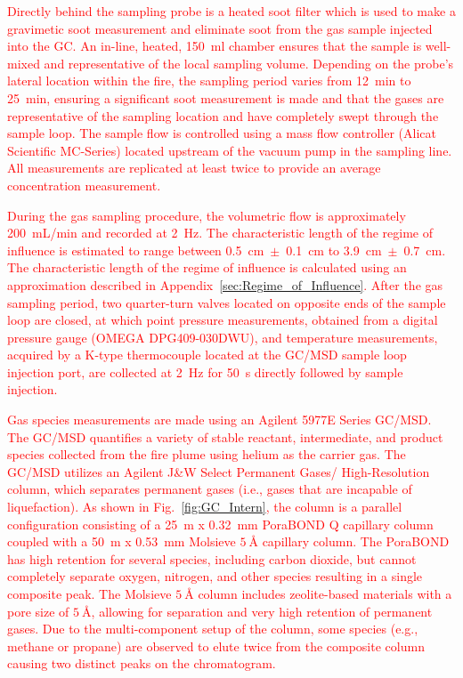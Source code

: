 \documentclass[12pt]{article}
\begin{document}
\textcolor{red}{Directly behind the sampling probe is a heated soot filter which is used to make a gravimetic soot measurement and eliminate soot from the gas sample injected into the GC. An in-line, heated, 150~ml chamber ensures that the sample is well-mixed and representative of the local sampling volume. Depending on the probe's lateral location within the fire, the sampling period varies from \SI{12}{min} to \SI{25}{min}, ensuring a significant soot measurement is made and that the gases are representative of the sampling location and have completely swept through the sample loop. The sample flow is controlled using a mass flow controller (Alicat Scientific MC-Series) located upstream of the vacuum pump in the sampling line. All measurements are replicated at least twice to provide an average concentration measurement.}

\textcolor{red}{During the gas sampling procedure, the volumetric flow is approximately 200~mL/min and recorded at \SI{2}{\hertz}. The characteristic length of the regime of influence is estimated to range between 0.5~cm~$\pm$~0.1~cm to 3.9~cm~$\pm$~0.7~cm. The characteristic length of the regime of influence is calculated using an approximation described in Appendix~\ref{sec:Regime_of_Influence}. After the gas sampling period, two quarter-turn valves located on opposite ends of the sample loop are closed, at which point pressure measurements, obtained from a digital pressure gauge (OMEGA DPG409-030DWU), and temperature measurements, acquired by a K-type thermocouple located at the GC/MSD sample loop injection port, are collected at \SI{2}{\hertz} for \SI{50}{s} directly followed by sample injection.}

\textcolor{red}{Gas species measurements are made using an Agilent 5977E Series GC/MSD. The GC/MSD quantifies a variety of stable reactant, intermediate, and product species collected from the fire plume using helium as the carrier gas. The GC/MSD utilizes an Agilent J\&W Select Permanent Gases/ High-Resolution column, which separates permanent gases (i.e., gases that are incapable of liquefaction). As shown in Fig.~\ref{fig:GC_Intern}, the column is a parallel configuration consisting of a 25~m x 0.32~mm PoraBOND Q capillary column coupled with a 50~m x 0.53~mm Molsieve $\SI{5}{\angstrom}$ capillary column. The PoraBOND has high retention for several species, including carbon dioxide, but cannot completely separate oxygen, nitrogen, and other species resulting in a single composite peak. The Molsieve $\SI{5}{\angstrom}$ column includes zeolite-based materials with a pore size of $\SI{5}{\angstrom}$, allowing for separation and very high retention of permanent gases. Due to the multi-component setup of the column, some species (e.g., methane or propane) are observed to elute twice from the composite column causing two distinct peaks on the chromatogram.}
\end{document}
